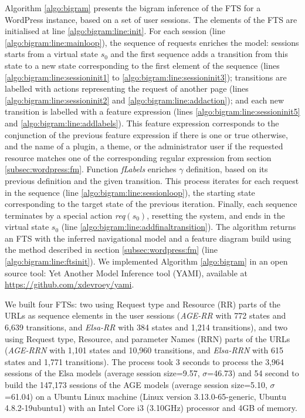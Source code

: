 Algorithm \ref{algo:bigram} presents the bigram inference of the FTS for a WordPress instance, based on a set of user sessions. The elements of the FTS are initialised at line \ref{algo:bigram:line:init}. For each session (line \ref{algo:bigram:line:mainloop}), the sequence of requests enriches the model: sessions starts from a virtual state $s_0$ and the first sequence adds a transition from this state to a new state corresponding to the first element of the sequence (lines \ref{algo:bigram:line:sessioninit1} to \ref{algo:bigram:line:sessioninit3}); transitions are labelled with actions representing the request of another page (lines \ref{algo:bigram:line:sessioninit2} and \ref{algo:bigram:line:addaction}); and each new transition is labelled with a feature expression (lines \ref{algo:bigram:line:sessioninit5} and \ref{algo:bigram:line:addlabels}).
%
This feature expression corresponds to the conjunction of the previous feature expression if there is one or true otherwise, and the  name of a plugin, a theme, or the administrator user if the requested resource matches one of the corresponding regular expression from section \ref{subsec:wordpress:fm}. Function \textit{fLabels} enriches $\gamma$ definition, based on its previous definition and the given transition. 
%
This process iterates for each request in the sequence (line \ref{algo:bigram:line:sessionloop}), the starting state corresponding to the target state of the previous iteration. Finally, each sequence terminates by a special action \textit{req}$(s_0)$, resetting the system, and ends in the virtual state $s_0$ (line \ref{algo:bigram:line:addfinaltransition}). The algorithm returns an FTS with the inferred navigational model and a feature diagram build using the method described in section \ref{subsec:wordpress:fm} (line \ref{algo:bigram:line:ftsinit}). We implemented Algorithm \ref{algo:bigram} in an open source tool: Yet Another Model Inference tool (YAMI), available at \url{https://github.com/xdevroey/yami}.

We built four FTSs: two using Request type and Resource (RR) parts of the URLs as sequence elements in the user sessions (\emph{AGE-RR} with 772 states and 6,639 transitions, and \emph{Elsa-RR} with 384 states and 1,214 transitions), and two using Request type, Resource, and parameter Names (RRN) parts of the URLs (\emph{AGE-RRN} with 1,101 states and 10,960 transitions, and \emph{Elsa-RRN} with 615 states and 1,771 transitions). The process took 3 seconds to process the 3,964 sessions of the Elsa models (average session size=9.57, $\sigma$=46.73) and 54 second to build the 147,173 sessions of the AGE models (average session size=5.10, $\sigma$=61.04) on a Ubuntu Linux machine (Linux version 3.13.0-65-generic, Ubuntu 4.8.2-19ubuntu1) with an Intel Core i3 (3.10GHz) processor and 4GB of memory.


